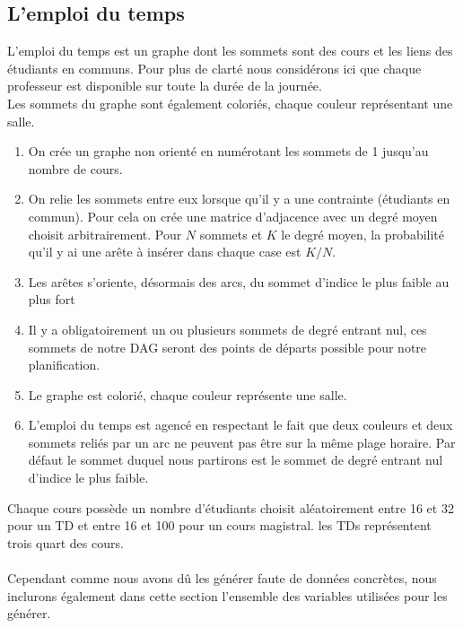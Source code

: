 \documentclass[a4paper,11pt]{article}
\begin{document}
	\subsection{L'emploi du temps}
		L'emploi du temps est un graphe dont les sommets sont des cours et les liens des étudiants en communs.
		Pour plus de clarté nous considérons ici que chaque professeur est disponible sur toute la durée de la journée.\\
		Les sommets du graphe sont également coloriés, chaque couleur représentant une salle.
		\begin{enumerate}
			\item On crée un graphe non orienté en numérotant les sommets de 1 jusqu'au nombre de cours.
			\item On relie les sommets entre eux lorsque qu'il y a une contrainte (étudiants en commun). Pour cela on crée une matrice d'adjacence avec un degré moyen choisit arbitrairement. Pour $N$ sommets et $K$ le degré moyen, la probabilité qu'il y ai une arête à insérer dans chaque case est $K/N$.
			\item Les arêtes s'oriente, désormais des arcs, du sommet d'indice le plus faible au plus fort
			\item Il y a obligatoirement un ou plusieurs sommets de degré entrant nul, ces sommets de notre DAG seront des points de départs possible pour notre planification.
			\item Le graphe est colorié, chaque couleur représente une salle.		
			\item L'emploi du temps est agencé en respectant le fait que deux couleurs et deux sommets reliés par un arc ne peuvent pas être sur la même plage horaire. Par défaut le sommet duquel nous partirons est le sommet de degré entrant nul d'indice le plus faible.
		\end{enumerate}
		Chaque cours possède un nombre d'étudiants choisit aléatoirement entre 16 et 32 pour un TD et entre 16 et 100 pour un cours magistral. les TDs représentent trois quart des cours.\\
		\\	
		Cependant comme nous avons dû les générer faute de données concrètes, nous inclurons également dans cette section l'ensemble des variables utilisées pour les générer.
\end{document}

